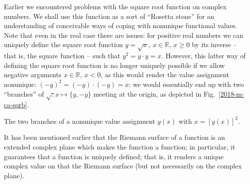 Earlier we encountered problems with the square root function on complex numbers.
We shall use this function as a sort of ``Rosetta stone'' for an understanding of conceivable ways of coping with nonunique functional values.
Note that even in the real case there  are issues:
for positive real numbers we can uniquely define the square root function $y=\sqrt{x}$, $x\in \mathbb{R}$, $x\ge 0$ by its inverse -- that is,
the square function -- such that $y^2=y\cdot y =x$.
However, this latter way of defining the square root function is no longer uniquely possible if we allow negative arguments $x\in \mathbb{R}$, $x < 0$,
as this would render the value assignment nonunique:  $(-y)^2=(-y)\cdot (-y) =x$: we would essentially end up with two ``branches'' of $\sqrt : x \mapsto \{y,-y\}$
meeting at the origin,
as depicted in Fig.~\ref{2018-m-ca-sqrb}.
\begin{marginfigure}
{\color{black}
\begin{center}
\end{center}
}
\caption{The two branches of a nonunique value assignment $y(x)$ with $x =\left[y(x)\right]^2$.
}
\label{2018-m-ca-sqrb}
\end{marginfigure}


It has been mentioned earlier that the Riemann surface of a function is an extended complex plane which makes the function a function; in particular,
it guarantees that a function is uniquely defined; that is, it renders a unique complex value on that the Riemann surface (but not necessarily on the complex plane).

